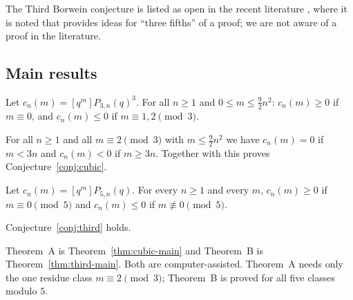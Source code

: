 The Third Borwein conjecture is listed as open in the recent literature \cite[Conj.~1.3]{BerkovichDhar}, where it is noted
that \cite{WK} provides ideas for ``three fifths'' of a proof; we are not aware of a proof in the literature.

\subsection{Main results}

\begin{conjecture}\label{conj:cubic}
Let $c_n(m)=[q^m]P_{3,n}(q)^3$. For all $n\ge1$ and $0\le m\le\frac92n^2$: $c_n(m)\ge0$ if $m\equiv0$, and $c_n(m)\le0$ if
$m\equiv1,2\pmod 3$.
\end{conjecture}

\begin{theoremA}
For all $n\ge1$ and all $m\equiv2\pmod3$ with $m\le\frac92n^2$ we have $c_n(m)=0$ if $m<3n$ and $c_n(m)<0$ if $m\ge3n$.
Together with \cite{WK} this proves Conjecture~\ref{conj:cubic}.
\end{theoremA}

\begin{conjecture}\label{conj:third}
Let $c_n(m)=[q^m]P_{5,n}(q)$. For every $n\ge1$ and every $m$, $c_n(m)\ge0$ if $m\equiv0\pmod5$ and $c_n(m)\le0$ if
$m\not\equiv0\pmod 5$.
\end{conjecture}

\begin{theoremB}
Conjecture~\ref{conj:third} holds.
\end{theoremB}

Theorem~A is Theorem~\ref{thm:cubic-main} and Theorem~B is Theorem~\ref{thm:third-main}. Both are computer-assisted.
Theorem~A needs only the one residue class $m\equiv2\pmod3$; Theorem~B is proved for all five classes modulo $5$.

